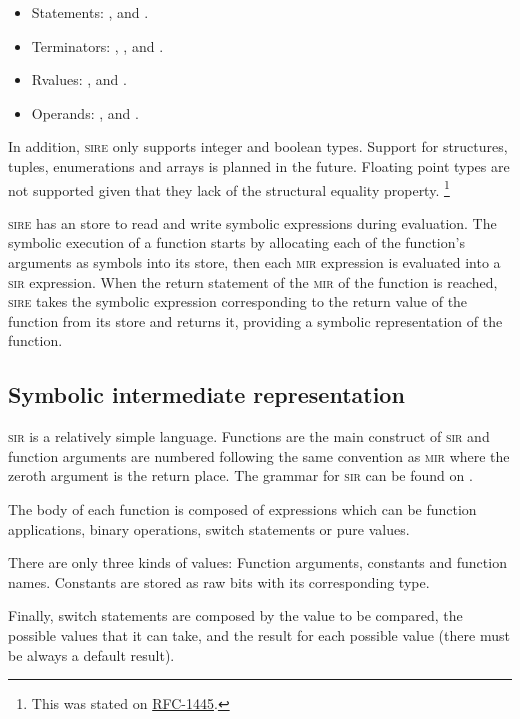 \begin{itemize}
    \item Statements: ,  and .
    \item Terminators: , ,  and .
    \item Rvalues: ,  and .
    \item Operands: ,  and .
\end{itemize}

In addition, \textsc{sire} only supports integer and boolean types. Support for
structures, tuples, enumerations and arrays is planned in the future. Floating
point types are not supported given that they lack of the structural equality
property. \footnote{This was stated on
\href{https://github.com/rust-lang/rfcs/blob/master/text/1445-restrict-constants-in-patterns.md}{RFC-1445}.}

\textsc{sire} has an store to read and write symbolic expressions during
evaluation. The symbolic execution of a function starts by allocating each of
the function's arguments as symbols into its store, then each \textsc{mir}
expression is evaluated into a \textsc{sir} expression. When the return
statement of the \textsc{mir} of the function is reached, \textsc{sire} takes
the symbolic expression corresponding to the return value of the function from
its store and returns it, providing a symbolic representation of the function. 


\subsection{Symbolic intermediate representation}

\textsc{sir} is a relatively simple language. Functions are the main construct
of \textsc{sir} and function arguments are numbered following the same
convention as \textsc{mir} where the zeroth argument is the return place. The
grammar for \textsc{sir} can be found on .

The body of each function is composed of expressions which can be function
applications, binary operations, switch statements or pure values. 

There are only three kinds of values: Function arguments, constants and
function names. Constants are stored as raw bits with its corresponding type. 

Finally, switch statements are composed by the value to be compared, the
possible values that it can take, and the result for each possible value (there
must be always a default result). 

